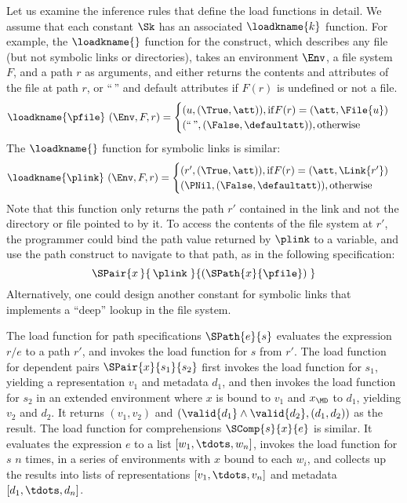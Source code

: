 Let us examine the inference rules that define the load functions in
detail. We assume that each constant $\Sk$ has an associated
$\loadkname{k}$ function. For example, the $\loadkname{}$ function for
the \pfile{} construct, which describes any file (but not symbolic
links or directories), takes an environment $\Env$, a file system $F$,
and a path $r$ as arguments, and either returns the contents and
attributes of the file at path $r$, or ``$\,$'' and default attributes
if $F(r)$ is undefined or not a file.
%
\[
\loadkname{\pfile}~(\Env,F,r) =
\begin{cases}
  (u,(\True,\att)), \mathrm{if } F(r) = (\att,\File{u}) \\
  (\text{``}{\,}\text{''},(\False,\defaultatt)), \mathrm{otherwise}\\
\end{cases}
\]
%
The $\loadkname{}$ function for symbolic links is similar:
%
\[
\loadkname{\plink}~(\Env,F,r) =
\begin{cases}
  (r',(\True,\att)), \mathrm{if } F(r) = (\att,\Link{r'}) \\
  (\PNil,(\False,\defaultatt)), \mathrm{otherwise}\\
\end{cases}
\]
%
Note that this function only returns the path $r'$ contained in the
link and not the directory or file pointed to by it. To access the
contents of the file system at $r'$, the programmer could bind the
path value returned by $\plink$ to a variable, and use the path
construct to navigate to that path, as in the following specification:
%
\[
\SPair{x\,}{\,\plink\;}{(\SPath{x}{\pfile})\;}
\]
%
Alternatively, one could design another constant for symbolic
links that implements a ``deep'' lookup in the file system.

The load function for path specifications $\SPath{e}{s}$ evaluates the
expression $r/e$ to a path $r'$, and invokes the load function for $s$
from $r'$. The load function for dependent pairs $\SPair{x}{s_1}{s_2}$
first invokes the load function for $s_1$, yielding a representation
$v_1$ and metadata $d_1$, and then invokes the load function for $s_2$
in an extended environment where $x$ is bound to $v_1$ and $x_{\MD}$
to $d_1$, yielding $v_2$ and $d_2$. It returns $(v_1,v_2)$ and
%
$(\valid{d_1} \wedge \valid{d_2},(d_1,d_2))$
%
as the result. The load function for comprehensions $\SComp{s}{x}{e}$
is similar. It evaluates the expression $e$ to a list
$[w_1,\tdots,w_n]$, invokes the load function for $s$ $n$ times, in a
series of environments with $x$ bound to each $w_i$, and collects up
the results into lists of representations $[v_1,\tdots,v_n]$ and
metadata $[d_1,\tdots,d_n]$.


